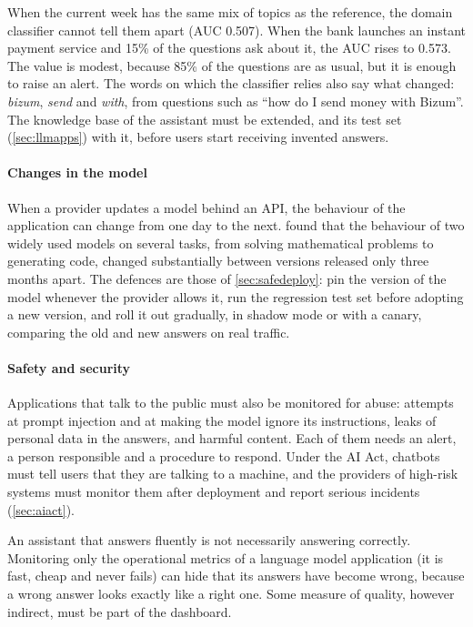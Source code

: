 When the current week has the same mix of topics as the reference, the domain classifier cannot tell them apart (AUC 0.507). When
the bank launches an instant payment service and 15\% of the questions ask about it, the AUC rises to 0.573. The value is modest, because
85\% of the questions are as usual, but it is enough to raise an alert. The words on which the classifier relies also say what changed:
\emph{bizum}, \emph{send} and \emph{with}, from questions such as ``how do I send money with Bizum''. The knowledge base of the
assistant must be extended, and its test set (\cref{sec:llmapps}) with it, before users start receiving invented answers.

\paragraph{Changes in the model} When a provider updates a model behind an API, the behaviour of the application can change from
one day to the next. \citet{chen2024chatgpt} found that the behaviour of two widely used models on several tasks, from solving mathematical
problems to generating code, changed substantially between versions released only three months apart. The
defences are those of \cref{sec:safedeploy}: pin the version of the model whenever the provider allows it, run the regression test
set before adopting a new version, and roll it out gradually, in shadow mode or with a canary, comparing the old and new answers on
real traffic.

\paragraph{Safety and security} Applications that talk to the public must also be monitored for abuse: attempts at prompt
injection and at making the model ignore its instructions, leaks of personal data in the answers, and harmful content. Each of
them needs an alert, a person responsible and a procedure to respond. Under the AI Act, chatbots must tell users that they are
talking to a machine, and the providers of high-risk systems must monitor them after deployment and report serious incidents
(\cref{sec:aiact}).

\begin{pitfall}
An assistant that answers fluently is not necessarily answering correctly. Monitoring only the operational metrics of a language
model application (it is fast, cheap and never fails) can hide that its answers have become wrong, because a wrong answer looks
exactly like a right one. Some measure of quality, however indirect, must be part of the dashboard.
\end{pitfall}

